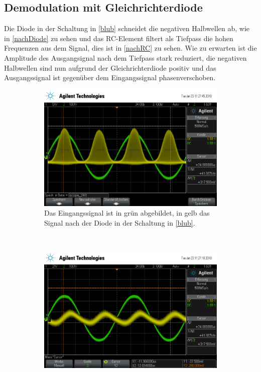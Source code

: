 \subsection{Demodulation mit Gleichrichterdiode}
\label{De-AM}

Die Diode in der Schaltung in \ref{blub} schneidet die negativen Halbwellen ab, wie in \autoref{nachDiode} zu sehen und das RC-Element filtert als Tiefpass die hohen Frequenzen aus dem Signal, dies ist in \autoref{nachRC} zu sehen. Wie zu erwarten ist die Amplitude des Ausgangsignal nach dem Tiefpass stark reduziert, die negativen Halbwellen sind nun aufgrund der Gleichrichterdiode positiv und das Ausgangssignal ist gegenüber dem Eingangssignal phasenverschoben.

\begin{figure}[t!]
	\centering
	\begin{subfigure}[t]{0.5\textwidth}
		\centering
		\includegraphics[width=\textwidth]{img/g_scope_243.png}
		\caption{Das Eingangssignal ist in grün abgebildet, in gelb das Signal nach der Diode in der Schaltung in \autoref{blub}.}
		\label{nachDiode}
	\end{subfigure}%
	~
	\begin{subfigure}[t]{0.5\textwidth}
		\centering
		\includegraphics[width=\textwidth]{img/g_scope_242.png}

\end{subfigure}
\end{figure}
